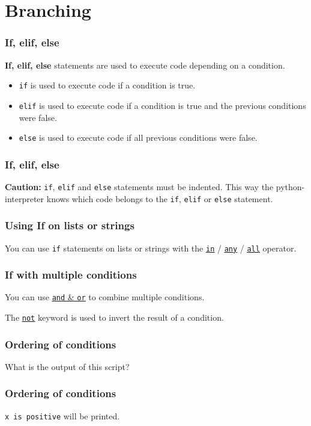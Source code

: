 \documentclass{beamer}
\newcommand{\hrefu}[2]{\underline{\href{#1}{#2}}}
\begin{document}
\section{Branching}
\begin{frame}
  \frametitle{If, elif, else}
  \textbf{If, elif, else} statements are used to execute code depending on a condition.
  \begin{itemize}
    \item \texttt{if} is used to execute code if a condition is true.
    \item \texttt{elif} is used to execute code if a condition is true and the previous conditions were false.
    \item \texttt{else} is used to execute code if all previous conditions were false.
  \end{itemize}
\end{frame}
\begin{frame}
  \frametitle{If, elif, else}
  \textbf{Caution:} \texttt{if}, \texttt{elif} and \texttt{else} statements must be indented. This way the python-interpreter knows which code belongs to the \texttt{if}, \texttt{elif} or \texttt{else} statement. 
  
\end{frame}
\begin{frame}

  \frametitle{Using If on lists or strings}
  You can use \texttt{if} statements on lists or strings with the \hrefu{https://www.w3schools.com/python/ref_keyword_in.asp}{\texttt{in}} / \hrefu{https://www.w3schools.com/python/ref_func_any.asp}{\texttt{any}} / \hrefu{https://www.w3schools.com/python/ref_func_all.asp}{\texttt{all}} operator.
  
\end{frame}
\begin{frame}
  \frametitle{If with multiple conditions}
  You can use \hrefu{https://www.w3schools.com/python/python_operators.asp}{\texttt{and} \& \texttt{or}} to combine multiple conditions.
  
  The \hrefu{https://www.w3schools.com/python/ref_keyword_not.asp}{\texttt{not}} keyword is used to invert the result of a condition.
\end{frame}
\begin{frame}
  \frametitle{Ordering of conditions}
  
  \vspace{5mm}
  What is the output of this script?
\end{frame}
\begin{frame}
  \frametitle{Ordering of conditions}
  
  \vspace{5mm}
  \texttt{x is positive} will be printed.
\end{frame}
\end{document}
